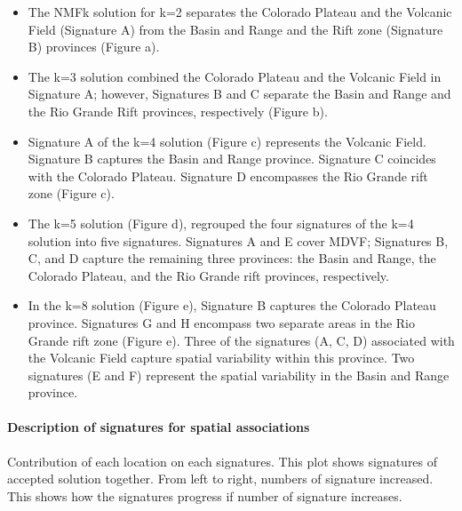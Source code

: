 \documentclass[11pt]{article}
\providecommand{\tightlist}{%
      \setlength{\itemsep}{0pt}\setlength{\parskip}{0pt}}
\begin{document}
\begin{itemize}
\tightlist
\item
  The NMFk solution for k=2 separates the Colorado Plateau and the
  Volcanic Field (Signature A) from the Basin and Range and the Rift
  zone (Signature B) provinces (Figure a).
\item
  The k=3 solution combined the Colorado Plateau and the Volcanic Field
  in Signature A; however, Signatures B and C separate the Basin and
  Range and the Rio Grande Rift provinces, respectively (Figure b).
\item
  Signature A of the k=4 solution (Figure c) represents the Volcanic
  Field. Signature B captures the Basin and Range province. Signature C
  coincides with the Colorado Plateau. Signature D encompasses the Rio
  Grande rift zone (Figure c).
\item
  The k=5 solution (Figure d), regrouped the four signatures of the k=4
  solution into five signatures. Signatures A and E cover MDVF;
  Signatures B, C, and D capture the remaining three provinces: the
  Basin and Range, the Colorado Plateau, and the Rio Grande rift
  provinces, respectively.
\item
  In the k=8 solution (Figure e), Signature B captures the Colorado
  Plateau province. Signatures G and H encompass two separate areas in
  the Rio Grande rift zone (Figure e). Three of the signatures (A, C, D)
  associated with the Volcanic Field capture spatial variability within
  this province. Two signatures (E and F) represent the spatial
  variability in the Basin and Range province.
\end{itemize}

    \hypertarget{description-of-signatures-for-spatial-associations}{%
\paragraph{Description of signatures for spatial
associations}\label{description-of-signatures-for-spatial-associations}}

Contribution of each location on each signatures. This plot shows
signatures of accepted solution together. From left to right, numbers of
signature increased. This shows how the signatures progress if number of
signature increases.
\end{document}
